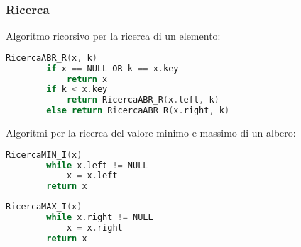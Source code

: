 \subsubsection{Ricerca}
Algoritmo ricorsivo per la ricerca di un elemento:
\begin{lstlisting}[language=C, caption=Ricerca ricorsiva, mathescape=true]
	RicercaABR_R(x, k)
		if x == NULL OR k == x.key
			return x
		if k < x.key
			return RicercaABR_R(x.left, k)
		else return RicercaABR_R(x.right, k)
\end{lstlisting}
Algoritmi per la ricerca del valore minimo e massimo di un albero:
\begin{lstlisting}[language=C, caption=Ricerca del minimo, mathescape=true]
	RicercaMIN_I(x)
		while x.left != NULL
			x = x.left
		return x
\end{lstlisting}
\begin{lstlisting}[language=C, caption=Ricerca del massimo, mathescape=true]
	RicercaMAX_I(x)
		while x.right != NULL
			x = x.right
		return x
\end{lstlisting}